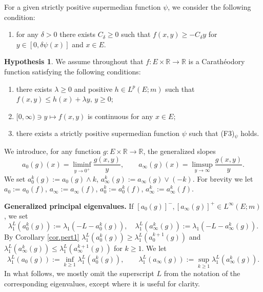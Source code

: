 \documentclass[11pt,a4paper,reqno]{amsart}
\theoremstyle{definition}
\newtheorem{hypothesis}[theorem]{Hypothesis}
\numberwithin{equation}{section}
\begin{document}
For a given strictly positive supermedian function $\psi$, 
we consider the following condition:
\begin{enumerate}
\item[(F3)$_\psi$]   for any $\delta>0$ there exists $C_\delta\ge 0$  such that $f(x,y)\ge -C_\delta y$ 
for $y\in [0,\delta \psi(x)]$ and $x\in E$.
\end{enumerate}



\begin{hypothesis}
\label{hyp.fff}
We  assume throughout that
$f:  E\times \mathbb R\to \mathbb R$ is a Carath\'eodory function satisfying the following conditions:

\begin{enumerate}
\item[(F1)] there exists $\lambda\ge 0$ and positive $h\in L^p(E;m)$ such that $f(x,y)\le h(x)+\lambda y,\, y\ge 0$;
\item[(F2)] $[0,\infty)\ni y\mapsto f(x,y)$ is continuous for any $x\in E$;
\item[(F3)]  there exists a strictly positive supermedian function $\psi$ such that (F3)$_\psi$ holds.
\end{enumerate}
\end{hypothesis}


We introduce, for any function $g:E\times\mathbb R\to\mathbb R$,  the generalized slopes
\begin{equation}
\label{eq.slopes}
a_0(g)(x)=\liminf_{y\to0^+}\frac{g(x,y)}{y},\qquad
a_\infty(g)(x)=\limsup_{y\to\infty}\frac{g(x,y)}{y}.
\end{equation}
We set  $a_0^k(g):=a_0(g)\wedge k$, $a_\infty^k(g):=a_\infty(g)\vee(-k)$. 
For brevity we let $a_0:=a_0(f)$, $a_\infty:=a_\infty(f)$, $a_0^k:=a^k_0(f)$, $a^k_\infty:=a^k_\infty(f)$.



{\bf Generalized principal eigenvalues.} 
If $[a_0(g)]^-,[a_\infty(g)]^+\in L^\infty(E;m)$, we set 
\[
\lambda_1^L(a_0^k(g)):=\lambda_1(-L-a_0^k(g)),\quad \lambda_1^L(a_\infty^k(g)):= \lambda_1(-L-a_\infty^k(g)).
\]
By Corollary \ref{cor.pert1} $\lambda_1^L(a_0^k(g))\ge \lambda_1^L(a_0^{k+1}(g))$ and   
$\lambda_1^L(a_\infty^k(g))\le \lambda_1^L(a_\infty^{k+1}(g))$ for $k\ge 1$. We let 
\[
\lambda_1^L(a_0(g)):=\inf_{k\ge 1}\lambda_1^L(a_0^k(g)),
\qquad
\lambda_1^L(a_\infty(g)):=\sup_{k\ge 1}\lambda_1^L(a_\infty^k(g)).
\]
In what follows, we mostly omit the superscript $L$ from the notation of the corresponding eigenvalues, 
except where it is useful for clarity.
\end{document}
